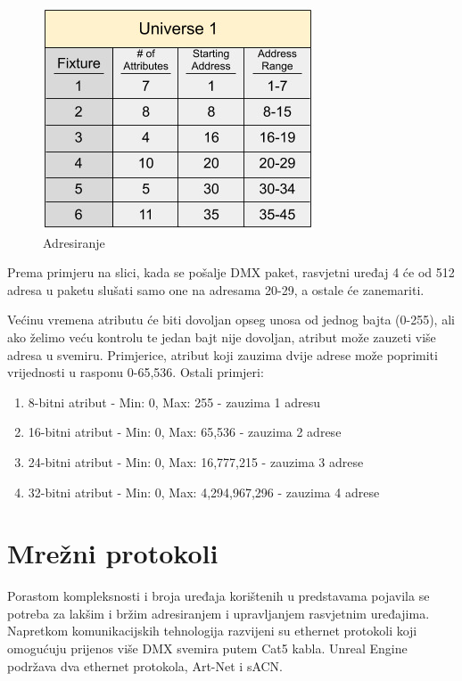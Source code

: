 \documentclass[times, utf8, zavrsni, numeric]{fer}
\begin{document}
\begin{figure}[htp]
	\centering
	\includegraphics[width=\linewidth]{slika 3-2.png}
	\caption{Adresiranje \cite{dmx_overview}}
	\label{fig:slika 3-2}
\end{figure}

Prema primjeru na slici, kada se pošalje DMX paket, rasvjetni uređaj 4 će od 512 adresa u paketu slušati samo one na adresama 20-29, a ostale će zanemariti.\newline

Većinu vremena atributu će biti dovoljan opseg unosa od jednog bajta (0-255), ali ako želimo veću kontrolu te jedan bajt nije dovoljan, atribut može zauzeti više adresa u svemiru. Primjerice, atribut koji zauzima dvije adrese može poprimiti vrijednosti u rasponu 0-65,536. Ostali primjeri:

\begin{enumerate}
	\item 8-bitni atribut - Min: 0, Max: 255 - zauzima 1 adresu
	\item 16-bitni atribut - Min: 0, Max: 65,536 - zauzima 2 adrese
	\item 24-bitni atribut - Min: 0, Max: 16,777,215  - zauzima 3 adrese
	\item 32-bitni atribut - Min: 0, Max: 4,294,967,296  - zauzima 4 adrese
\end{enumerate}

\section{Mrežni protokoli}
Porastom kompleksnosti i broja uređaja korištenih u predstavama pojavila se potreba za lakšim i bržim adresiranjem i upravljanjem rasvjetnim uređajima. Napretkom komunikacijskih tehnologija razvijeni su ethernet protokoli koji omogućuju prijenos više DMX svemira putem Cat5 kabla. Unreal Engine podržava dva ethernet protokola, Art-Net i sACN.
\end{document}
